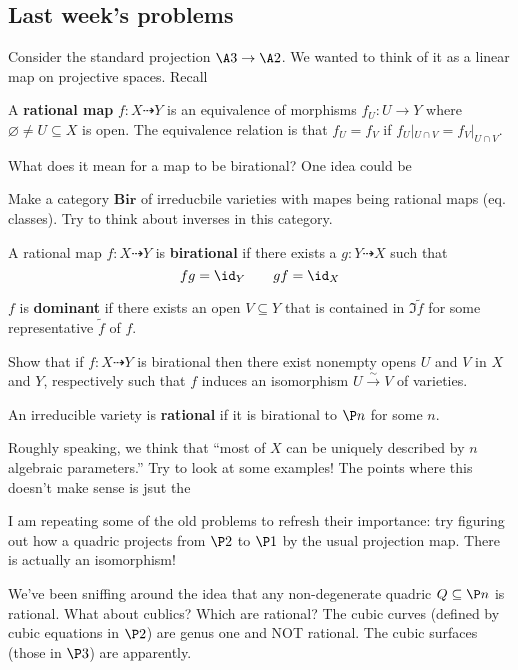 \documentclass[12pt]{article}
\begin{document}
\subsection{Last week's problems}
Consider the standard projection $\A3\to\A2$. We wanted to think of it as a linear map on projective spaces. Recall 
\begin{defn}
	A \textbf{rational map} $f:X\dashrightarrow Y$ is an equivalence of morphisms $f_U:U\to Y$ where $\varnothing\ne U\subseteq X$ is open. The equivalence 
	relation is that $f_U=f_V$ if $f_U|_{U\cap V}=f_V|_{U\cap V}$.
\end{defn}
What does it mean for a map to be birational? One idea could be
\begin{prob}
	Make a category $\mathbf{Bir}$ of irreducbile varieties with mapes being rational maps (eq. classes). Try to think about inverses in this category.
\end{prob}
\begin{defn}
	A rational map $f:X\dashrightarrow Y$ is \textbf{birational} if there exists a $g:Y\dashrightarrow X$ such that 
	\[fg=\id_Y\qquad gf =\id_X\]
	
	$f$ is \textbf{dominant} if there exists an open $V\subseteq Y$ that is contained in $\Im \tilde f$ for some representative $\tilde f$ of $f$.
\end{defn}
\begin{prob}
	Show that if $f:X\dashrightarrow Y$ is birational then there exist nonempty opens $U$ and $V$ in $X$ and $Y$, respectively such that $f$ induces an isomorphism $U\xrightarrow{\sim} V$ of varieties.
\end{prob}
\begin{defn}
	An irreducible variety is \textbf{rational} if it is birational to $\P n$ for some $n$.
\end{defn}
\begin{rmk}
	Roughly speaking, we think that ``most of $X$ can be uniquely described by $n$ algebraic parameters.'' Try to look at some examples! The points where this doesn't make sense is jsut the 
\end{rmk}
\begin{prob}
	I am repeating some of the old problems to refresh their importance: try figuring out how a quadric projects from $\P2$ to $\P1$ by the usual projection map. There is actually an isomorphism!
\end{prob}
We've been sniffing around the idea that any non-degenerate quadric $Q\subseteq \P n$ is rational. What about cublics? Which are rational? The cubic curves (defined by cubic equations in $\P2$)
are genus one and NOT rational. The cubic surfaces (those in $\P3$) are apparently.
\end{document}
